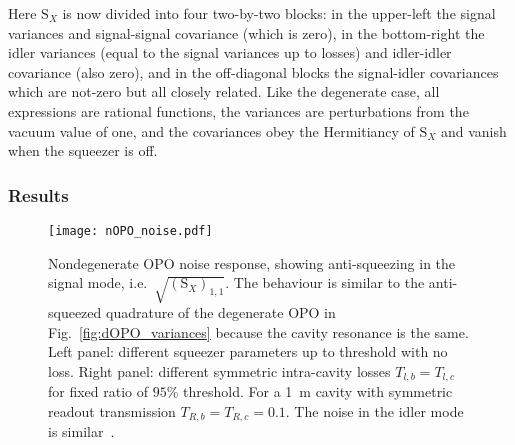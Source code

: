 Here $\text{S}_X$ is now divided into four two-by-two blocks: in the upper-left the signal variances and signal-signal covariance (which is zero), in the bottom-right the idler variances (equal to the signal variances up to losses) and idler-idler covariance (also zero), and in the off-diagonal blocks the signal-idler covariances which are not-zero but all closely related. Like the degenerate case, all expressions are rational functions, the variances are perturbations from the vacuum value of one, and the covariances obey the Hermitiancy of $\text{S}_X$ and vanish when the squeezer is off. 

\subsubsection{Results} %
\label{sec:nOPO_results}

\begin{figure}
	\centering
	\texttt{[image: nOPO\_noise.pdf]}
	\caption{ Nondegenerate OPO noise response, showing anti-squeezing in the signal mode, i.e.\ $\sqrt{(\text{S}_X)_{1,1}}$. The behaviour is similar to the anti-squeezed quadrature of the degenerate OPO in Fig.~\ref{fig:dOPO_variances} because the cavity resonance is the same. Left panel: different squeezer parameters up to threshold with no loss. Right panel: different symmetric intra-cavity losses $T_{l,b}=T_{l,c}$ for fixed ratio of $95\%$ threshold. For a 1~m cavity with symmetric readout transmission $T_{R,b}=T_{R,c}=0.1$. The noise in the idler mode is similar~\cite{}.}
	\label{fig:nOPO_variances}
\end{figure}

